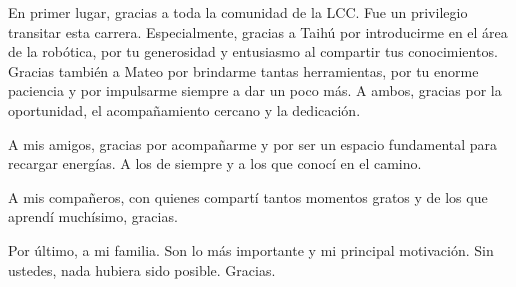 En primer lugar, gracias a toda la comunidad de la LCC. Fue un privilegio transitar esta carrera.
Especialmente, gracias a Taihú por introducirme en el área de la robótica, por tu generosidad y entusiasmo al compartir tus conocimientos. Gracias también a Mateo por brindarme tantas herramientas, por tu enorme paciencia y por impulsarme siempre a dar un poco más. A ambos, gracias por la oportunidad, el acompañamiento cercano y la dedicación.

A mis amigos, gracias por acompañarme y por ser un espacio fundamental para recargar energías. A los de siempre y a los que conocí en el camino.

A mis compañeros, con quienes compartí tantos momentos gratos y de los que aprendí muchísimo, gracias.

Por último, a mi familia. Son lo más importante y mi principal motivación. Sin ustedes, nada hubiera sido posible. Gracias.
